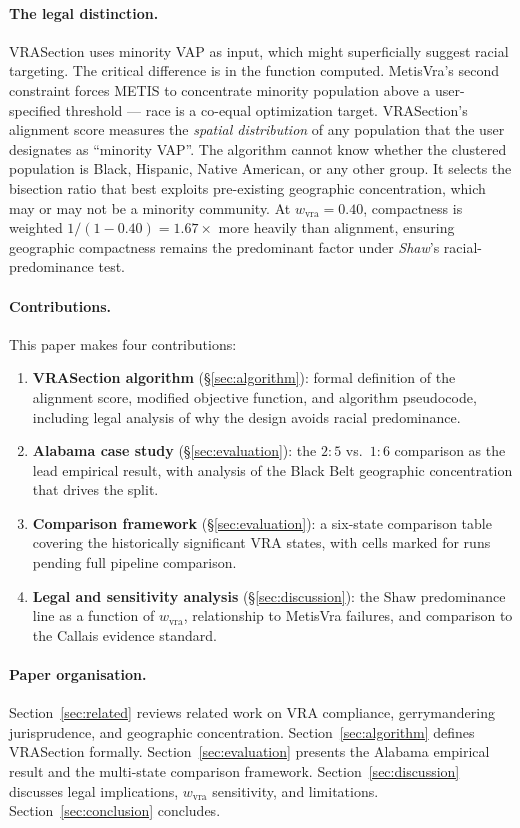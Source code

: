 \paragraph{The legal distinction.}
VRASection uses minority VAP as input, which might superficially suggest
racial targeting.
The critical difference is in the function computed.
MetisVra's second constraint forces METIS to concentrate minority
population above a user-specified threshold --- race is a co-equal
optimization target.
VRASection's alignment score measures the \emph{spatial distribution}
of any population that the user designates as ``minority VAP''.
The algorithm cannot know whether the clustered population is Black,
Hispanic, Native American, or any other group.
It selects the bisection ratio that best exploits pre-existing geographic
concentration, which may or may not be a minority community.
At $w_\text{vra} = 0.40$, compactness is weighted $1 / (1 - 0.40) = 1.67\times$
more heavily than alignment, ensuring geographic compactness remains the
predominant factor under \emph{Shaw}'s racial-predominance test.

\paragraph{Contributions.}
This paper makes four contributions:

\begin{enumerate}
\item \textbf{VRASection algorithm} (\S\ref{sec:algorithm}): formal
  definition of the alignment score, modified objective function, and
  algorithm pseudocode, including legal analysis of why the design
  avoids racial predominance.

\item \textbf{Alabama case study} (\S\ref{sec:evaluation}): the $2:5$
  vs.\ $1:6$ comparison as the lead empirical result, with analysis of
  the Black Belt geographic concentration that drives the split.

\item \textbf{Comparison framework} (\S\ref{sec:evaluation}): a six-state
  comparison table covering the historically significant VRA states,
  with cells marked for runs pending full pipeline comparison.

\item \textbf{Legal and sensitivity analysis} (\S\ref{sec:discussion}):
  the Shaw predominance line as a function of $w_\text{vra}$, relationship
  to MetisVra failures, and comparison to the Callais evidence standard.
\end{enumerate}

\paragraph{Paper organisation.}
Section~\ref{sec:related} reviews related work on VRA compliance,
gerrymandering jurisprudence, and geographic concentration.
Section~\ref{sec:algorithm} defines VRASection formally.
Section~\ref{sec:evaluation} presents the Alabama empirical result
and the multi-state comparison framework.
Section~\ref{sec:discussion} discusses legal implications, $w_\text{vra}$
sensitivity, and limitations.
Section~\ref{sec:conclusion} concludes.
